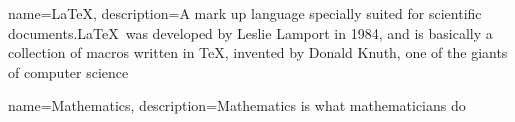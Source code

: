 \RequirePackage[toc]{glossaries}
\makeglossaries

{
    name=\LaTeX,
    description={A mark up language specially suited 
    for scientific documents.\LaTeX\ was developed by Leslie Lamport in 1984, and is basically a collection of macros written in \TeX, invented by Donald Knuth, one of the giants of computer science}
}

{
    name=Mathematics,
    description={Mathematics is what mathematicians do}
}




